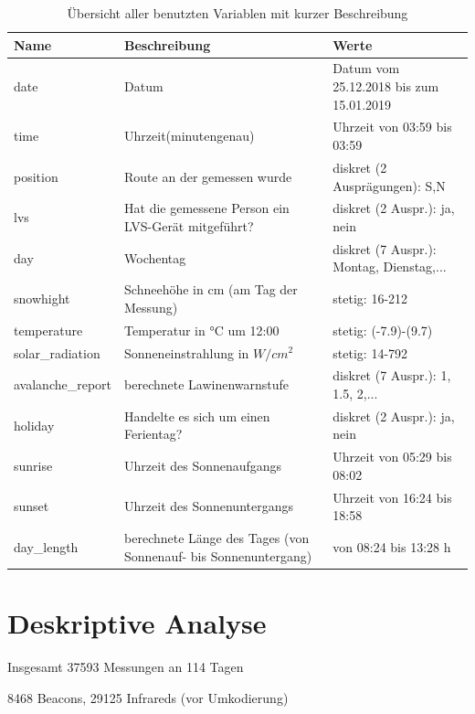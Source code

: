 \documentclass[12pt]{article}
\begin{document}
	
	\begin{table}
		\centering
		\caption{Übersicht aller benutzten Variablen mit kurzer Beschreibung}
		\begin{adjustbox}{max width=\textwidth}
		\begin{tabular}{l|l|l}
			\textbf{Name} & \textbf{Beschreibung} & \textbf{Werte} \\
			\hline
			\hline
			date & Datum & Datum vom 25.12.2018 bis zum 15.01.2019 \\
			\hline
			time & Uhrzeit(minutengenau) & Uhrzeit von 03:59 bis 03:59 \\
			\hline
			position & Route an der gemessen wurde & diskret (2 Ausprägungen): S,N \\
			\hline
			lvs & Hat die gemessene Person ein LVS-Gerät mitgeführt? & diskret (2 Auspr.): ja, nein \\
			\hline
			day & Wochentag & diskret (7 Auspr.): Montag, Dienstag,... \\
			\hline
			snowhight & Schneehöhe in cm (am Tag der Messung) & stetig: 16-212 \\
			\hline
			temperature & Temperatur in °C um 12:00 & stetig: (-7.9)-(9.7) \\
			\hline
			solar\_radiation & Sonneneinstrahlung in $W/cm^2$ & stetig: 14-792 \\
			\hline
			avalanche\_report & berechnete Lawinenwarnstufe & diskret (7 Auspr.): 1, 1.5, 2,... \\
			\hline
			holiday & Handelte es sich um einen Ferientag? & diskret (2 Auspr.): ja, nein \\
			\hline
			sunrise & Uhrzeit des Sonnenaufgangs & Uhrzeit von 05:29 bis 08:02 \\
			\hline
			sunset & Uhrzeit des Sonnenuntergangs & Uhrzeit von 16:24 bis 18:58 \\
			\hline
			day\_length & berechnete Länge des Tages (von Sonnenauf- bis Sonnenuntergang) & von 08:24 bis 13:28 h \\
			\hline
		\end{tabular}
		\end{adjustbox}
		\label{tab:var}
		\end{table}
	
	\section{Deskriptive Analyse}
	Insgesamt 37593 Messungen an 114 Tagen
	
	8468 Beacons, 29125 Infrareds (vor Umkodierung)
	
\end{document}

